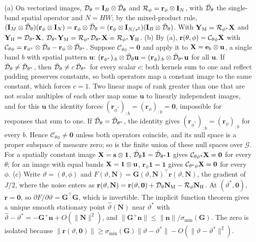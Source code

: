 \documentclass[journal]{IEEEtran}
\begin{document}
\begin{IEEEproof}
(a) On vectorized images, $\mathcal{D}_\theta=\mathbf{I}_B\otimes\bar{\mathcal{D}}_\theta$ and $\mathcal{R}_\phi=\mathbf{r}_\phi\otimes\mathbf{I}_N$, with $\bar{\mathcal{D}}_\theta$ the single-band spatial operator and $N=HW$; by the mixed-product rule, $(\mathbf{I}_M\otimes\bar{\mathcal{D}}_\theta)(\mathbf{r}_\phi\otimes\mathbf{I}_N)=\mathbf{r}_\phi\otimes\bar{\mathcal{D}}_\theta=(\mathbf{r}_\phi\otimes\mathbf{I}_{N/s^2})(\mathbf{I}_B\otimes\bar{\mathcal{D}}_\theta)$. With $\mathbf{Y}_{\mathrm{M}}=\mathcal{R}_{\phi^*}\mathbf{X}$ and $\mathbf{Y}_{\mathrm{H}}=\mathcal{D}_{\theta^*}\mathbf{X}$, $\mathcal{D}_{\theta^*}\mathbf{Y}_{\mathrm{M}}=\mathcal{R}_{\phi^*}\mathcal{D}_{\theta^*}\mathbf{X}=\mathcal{R}_{\phi^*}\mathbf{Y}_{\mathrm{H}}$.
(b) By (a), $\mathbf{r}(\theta,\phi)=\mathcal{C}_{\theta\phi}\mathbf{X}$ with $\mathcal{C}_{\theta\phi}=\mathbf{r}_{\phi^*}\otimes\bar{\mathcal{D}}_\theta-\mathbf{r}_\phi\otimes\bar{\mathcal{D}}_{\theta^*}$. Suppose $\mathcal{C}_{\theta\phi}=\mathbf{0}$ and apply it to $\mathbf{X}=\mathbf{e}_b\otimes\mathbf{u}$, a single band $b$ with spatial pattern $\mathbf{u}$: $(\mathbf{r}_{\phi^*})_{:b}\otimes\bar{\mathcal{D}}_\theta\mathbf{u}=(\mathbf{r}_\phi)_{:b}\otimes\bar{\mathcal{D}}_{\theta^*}\mathbf{u}$ for all $\mathbf{u}$. If $\bar{\mathcal{D}}_\theta\neq\bar{\mathcal{D}}_{\theta^*}$, then $\bar{\mathcal{D}}_\theta\neq c\,\bar{\mathcal{D}}_{\theta^*}$ for every scalar $c$: both kernels sum to one and reflect padding preserves constants, so both operators map a constant image to the same constant, which forces $c=1$. Two linear maps of rank greater than one that are not scalar multiples of each other map some $\mathbf{u}$ to linearly independent images, and for this $\mathbf{u}$ the identity forces $(\mathbf{r}_{\phi^*})_{:b}=(\mathbf{r}_\phi)_{:b}=\mathbf{0}$, impossible for responses that sum to one. If $\bar{\mathcal{D}}_\theta=\bar{\mathcal{D}}_{\theta^*}$, the identity gives $(\mathbf{r}_{\phi^*})_{:b}=(\mathbf{r}_\phi)_{:b}$ for every $b$. Hence $\mathcal{C}_{\theta\phi}\neq\mathbf{0}$ unless both operators coincide, and its null space is a proper subspace of measure zero; so is the finite union of these null spaces over $\mathcal{G}$. For a spatially constant image $\mathbf{X}=\mathbf{s}\otimes\mathbf{1}$, $\bar{\mathcal{D}}_\theta\mathbf{1}=\bar{\mathcal{D}}_{\theta^*}\mathbf{1}$ gives $\mathcal{C}_{\theta\phi^*}\mathbf{X}=\mathbf{0}$ for every $\theta$; for an image with equal bands $\mathbf{X}=\mathbf{1}\otimes\mathbf{u}$, $\mathbf{r}_\phi\mathbf{1}=\mathbf{1}$ gives $\mathcal{C}_{\theta^*\phi}\mathbf{X}=\mathbf{0}$ for every $\phi$.
(c) Write $\vartheta=(\theta,\phi)$ and $F(\vartheta,\mathbf{N})=\mathbf{G}(\vartheta,\mathbf{N})^{\top}\mathbf{r}(\vartheta,\mathbf{N})$, the gradient of $J/2$, where the noise enters as $\mathbf{r}(\vartheta,\mathbf{N})=\mathbf{r}(\vartheta,\mathbf{0})+\mathcal{D}_\theta\mathbf{N}_{\mathrm{M}}-\mathcal{R}_\phi\mathbf{N}_{\mathrm{H}}$. At $(\vartheta^*,\mathbf{0})$, $\mathbf{r}=\mathbf{0}$, so $\partial F/\partial\vartheta=\mathbf{G}^{\top}\mathbf{G}$, which is invertible. The implicit function theorem gives a unique smooth stationary point $\hat\vartheta(\mathbf{N})$ near $\vartheta^*$ with $\hat\vartheta-\vartheta^*=-\mathbf{G}^{+}\mathbf{n}+O(\|\mathbf{N}\|^2)$, and $\|\mathbf{G}^{+}\mathbf{n}\|\le\|\mathbf{n}\|/\sigma_{\min}(\mathbf{G})$. The zero is isolated because $\|\mathbf{r}(\vartheta,\mathbf{0})\|\ge\sigma_{\min}(\mathbf{G})\|\vartheta-\vartheta^*\|-O(\|\vartheta-\vartheta^*\|^2)$.
\end{IEEEproof}
\end{document}
